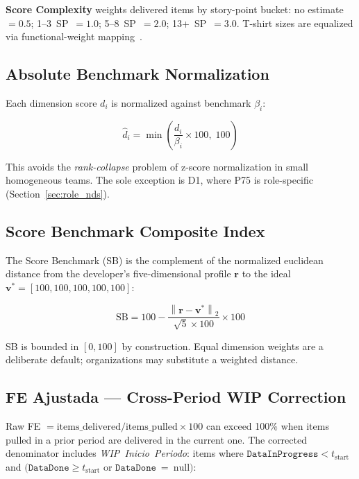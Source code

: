 \documentclass[conference]{IEEEtran}
\begin{document}
\textbf{Score Complexity} weights delivered items by story-point bucket: no
estimate~$=0.5$; 1--3~SP~$=1.0$; 5--8~SP~$=2.0$; 13+~SP~$=3.0$. T-shirt sizes
are equalized via functional-weight mapping~\cite{kitchenham2004}.

\subsection{Absolute Benchmark Normalization}

Each dimension score $d_i$ is normalized against benchmark $\beta_i$:

\begin{equation}
  \hat{d}_i = \min\!\left(\frac{d_i}{\beta_i} \times 100,\; 100\right)
  \label{eq:norm}
\end{equation}

This avoids the \emph{rank-collapse} problem of z-score normalization in small
homogeneous teams. The sole exception is D1, where P75 is role-specific
(Section~\ref{sec:role_nds}).

\subsection{Score Benchmark Composite Index}

The Score Benchmark (SB) is the complement of the normalized euclidean distance
from the developer's five-dimensional profile $\mathbf{r}$ to the ideal
$\mathbf{v}^* = [100,100,100,100,100]$:

\begin{equation}
  \text{SB} = 100 - \frac{\left\|\mathbf{r} - \mathbf{v}^*\right\|_2}{\sqrt{5}\times 100} \times 100
  \label{eq:sb}
\end{equation}

SB is bounded in $[0,100]$ by construction. Equal dimension weights are a
deliberate default; organizations may substitute a weighted distance.

\subsection{FE Ajustada --- Cross-Period WIP Correction}
\label{sec:fe_ajustada}

Raw FE $= \text{items\_delivered} / \text{items\_pulled} \times 100$ can exceed
100\% when items pulled in a prior period are delivered in the current one. The
corrected denominator includes \emph{WIP~Inicio~Periodo}: items where
$\texttt{DataInProgress} < t_\text{start}$ and $(\texttt{DataDone} \geq
t_\text{start}$ or $\texttt{DataDone}~=~\text{null})$:
\end{document}

